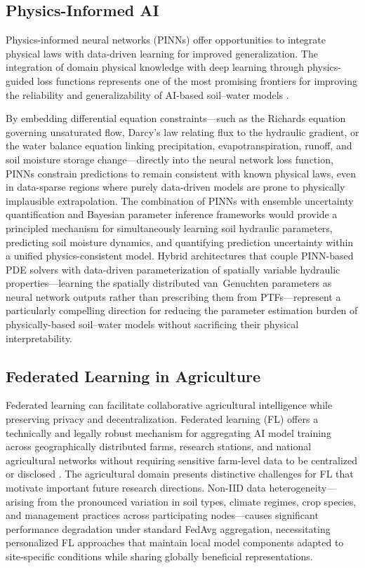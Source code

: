 \documentclass[land,review,accept,pdftex,oneauthor]{Definitions/mdpi}
\begin{document}

\subsection{Physics-Informed AI}

Physics-informed neural networks (PINNs) offer opportunities to integrate physical laws with data-driven learning for improved generalization. The integration of domain physical knowledge with deep learning through {physics-guided loss functions} represents one of the most promising frontiers for improving the reliability and generalizability of AI-based soil--water models \citep{Karniadakis2021}. 

By embedding differential equation constraints---such as the Richards equation governing unsaturated flow, Darcy's law relating flux to the hydraulic gradient, or the water balance equation linking precipitation, evapotranspiration, runoff, and soil moisture storage change---directly into the neural network loss function, PINNs constrain predictions to remain consistent with known physical laws, even in data-sparse regions where purely data-driven models are prone to physically implausible extrapolation.  The combination of PINNs with ensemble uncertainty quantification and Bayesian parameter inference frameworks would provide a principled mechanism for simultaneously learning soil hydraulic parameters, predicting soil moisture dynamics, and quantifying prediction uncertainty within a unified physics-consistent model. Hybrid architectures that couple PINN-based PDE solvers with data-driven parameterization of spatially variable hydraulic properties---learning the spatially distributed van~Genuchten parameters as neural network outputs rather than prescribing them from PTFs---represent a particularly compelling direction for reducing the parameter estimation burden of physically-based soil--water models without sacrificing their physical interpretability.

\subsection{Federated Learning in Agriculture}

Federated learning can facilitate collaborative agricultural intelligence while preserving privacy and decentralization. Federated learning (FL) offers a technically and legally robust mechanism for 
aggregating AI model training across geographically distributed farms, research 
stations, and national agricultural networks without requiring sensitive farm-level 
data to be centralized or disclosed \citep{zalik2023federated}. The agricultural domain presents distinctive challenges for FL that motivate important future research directions. Non-IID data heterogeneity---arising from the pronounced variation in soil types, climate regimes, crop species, and management practices across participating nodes---causes significant performance degradation under standard FedAvg aggregation, necessitating personalized FL approaches that maintain local model components adapted to site-specific conditions while sharing globally beneficial representations. 
\end{document}
